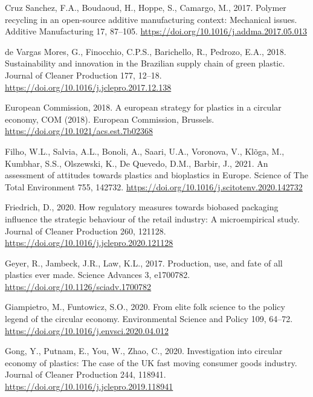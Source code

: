 \documentclass[]{elsarticle} %
\newlength{\cslhangindent}
\newlength{\cslentryspacingunit} %
\newenvironment{CSLReferences}[2] %
 {%
  \setlength{\parindent}{0pt}
  \ifodd #1
  \let\oldpar\par
  \def\par{\hangindent=\cslhangindent\oldpar}
  \fi
  \setlength{\parskip}{#2\cslentryspacingunit}
 }%
 {}
\begin{document}
\begin{CSLReferences}{1}{0}
\leavevmode{}%
Cruz Sanchez, F.A., Boudaoud, H., Hoppe, S., Camargo, M., 2017. Polymer recycling in an open-source additive manufacturing context: {Mechanical} issues. Additive Manufacturing 17, 87--105. \url{https://doi.org/10.1016/j.addma.2017.05.013}

\leavevmode{}%
de Vargas Mores, G., Finocchio, C.P.S., Barichello, R., Pedrozo, E.A., 2018. Sustainability and innovation in the {Brazilian} supply chain of green plastic. Journal of Cleaner Production 177, 12--18. \url{https://doi.org/10.1016/j.jclepro.2017.12.138}

\leavevmode{}%
European Commission, 2018. A european strategy for plastics in a circular economy, COM (2018). {European Commission}, {Brussels}. \url{https://doi.org/10.1021/acs.est.7b02368}

\leavevmode{}%
Filho, W.L., Salvia, A.L., Bonoli, A., Saari, U.A., Voronova, V., Klõga, M., Kumbhar, S.S., Olszewski, K., De Quevedo, D.M., Barbir, J., 2021. An assessment of attitudes towards plastics and bioplastics in {Europe}. Science of The Total Environment 755, 142732. \url{https://doi.org/10.1016/j.scitotenv.2020.142732}

\leavevmode{}%
Friedrich, D., 2020. How regulatory measures towards biobased packaging influence the strategic behaviour of the retail industry: {A} microempirical study. Journal of Cleaner Production 260, 121128. \url{https://doi.org/10.1016/j.jclepro.2020.121128}

\leavevmode{}%
Geyer, R., Jambeck, J.R., Law, K.L., 2017. Production, use, and fate of all plastics ever made. Science Advances 3, e1700782. \url{https://doi.org/10.1126/sciadv.1700782}

\leavevmode{}%
Giampietro, M., Funtowicz, S.O., 2020. From elite folk science to the policy legend of the circular economy. Environmental Science and Policy 109, 64--72. \url{https://doi.org/10.1016/j.envsci.2020.04.012}

\leavevmode{}%
Gong, Y., Putnam, E., You, W., Zhao, C., 2020. Investigation into circular economy of plastics: {The} case of the {UK} fast moving consumer goods industry. Journal of Cleaner Production 244, 118941. \url{https://doi.org/10.1016/j.jclepro.2019.118941}


\end{CSLReferences}
\end{document}

